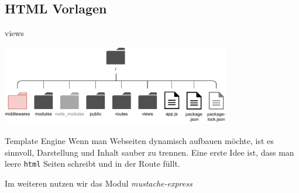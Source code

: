 \subsection{HTML Vorlagen}

\begin{bonus}{views}
    \begin{center}
        \includegraphics[width=0.75\textwidth]{includes/figures/bonus_nodejs_middlewares.pdf}
    \end{center}
\end{bonus}

\begin{defi}{Template Engine}
    Wenn man Webseiten dynamisch aufbauen möchte, ist es sinnvoll, Darstellung und Inhalt sauber zu trennen.
    Eine erste Idee ist, dass man leere \texttt{html} Seiten schreibt und in der Route füllt.

    Im weiteren nutzen wir das Modul \emph{mustache-express}
\end{defi}

